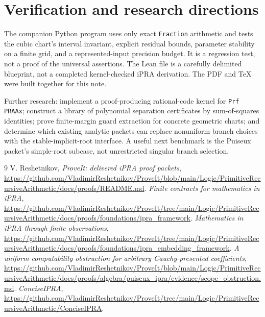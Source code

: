 \documentclass[11pt]{article}
\begin{document}
\section{Verification and research directions}
The companion Python program uses only exact \texttt{Fraction} arithmetic and tests the cubic chart's interval invariant, explicit residual bounds, parameter stability on a finite grid, and a represented-input precision budget. It is a regression test, not a proof of the universal assertions. The Lean file is a carefully delimited blueprint, not a completed kernel-checked iPRA derivation. The PDF and TeX were built together for this note.

Further research: implement a proof-producing rational-code kernel for \texttt{Prf PRAAx}; construct a library of polynomial separation certificates by sum-of-squares identities; prove finite-margin guard extraction for concrete geometric charts; and determine which existing analytic packets can replace nonuniform branch choices with the stable-implicit-root interface. A useful next benchmark is the Puiseux packet's simple-root subcase, not unrestricted singular branch selection.

\begin{thebibliography}{9}
 V. Reshetnikov, \emph{ProveIt: delivered iPRA proof packets}, \url{https://github.com/VladimirReshetnikov/ProveIt/blob/main/Logic/PrimitiveRecursiveArithmetic/docs/proofs/README.md}.
 \emph{Finite contracts for mathematics in iPRA}, \url{https://github.com/VladimirReshetnikov/ProveIt/tree/main/Logic/PrimitiveRecursiveArithmetic/docs/proofs/foundations/ipra_framework}.
 \emph{Mathematics in iPRA through finite observations}, \url{https://github.com/VladimirReshetnikov/ProveIt/tree/main/Logic/PrimitiveRecursiveArithmetic/docs/proofs/foundations/ipra_embedding_framework}.
 \emph{A uniform computability obstruction for arbitrary Cauchy-presented coefficients}, \url{https://github.com/VladimirReshetnikov/ProveIt/blob/main/Logic/PrimitiveRecursiveArithmetic/docs/proofs/algebra/puiseux_ipra/evidence/scope_obstruction.md}.
 \emph{ConciseIPRA}, \url{https://github.com/VladimirReshetnikov/ProveIt/tree/main/Logic/PrimitiveRecursiveArithmetic/ConciseIPRA}.
\end{thebibliography}
\end{document}
